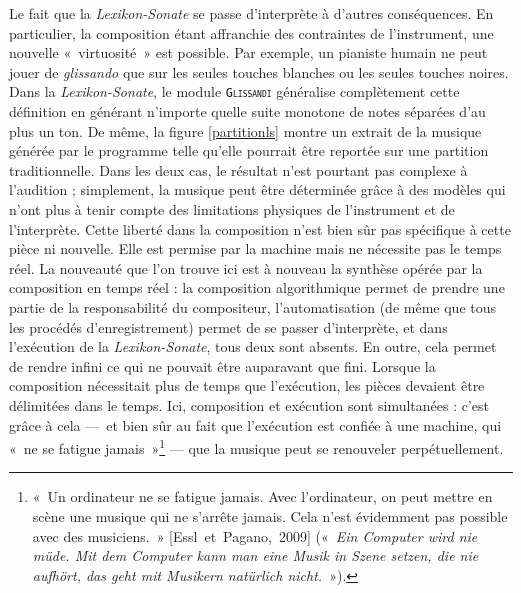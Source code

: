 \documentclass[a4paper,12pt]{article}
\newcommand{\guill}[1]{«~#1~»}
\newcommand{\cicite}[1]{{\footnotesize[#1]}}
\begin{document}
Le fait que la \emph{Lexikon-Sonate} se passe d'interprète à d'autres conséquences. En particulier, la composition étant affranchie des contraintes de l'instrument, une nouvelle \guill{virtuosité} est possible. Par exemple, un pianiste humain ne peut jouer de \emph{glissando} que sur les seules touches blanches ou les seules touches noires. Dans la \emph{Lexikon-Sonate}, le module \texttt{\textsc{Glissandi}} généralise complètement cette définition en générant n'importe quelle suite monotone de notes séparées d'au plus un ton. De même, la figure \ref{partitionls} montre un extrait de la musique générée par le programme telle qu'elle pourrait être reportée sur une partition traditionnelle. Dans les deux cas, le résultat n'est pourtant pas complexe à l'audition ; simplement, la musique peut être déterminée grâce à des modèles qui n'ont plus à tenir compte des limitations physiques de l'instrument et de l'interprète. Cette liberté dans la composition n'est bien sûr pas spécifique à cette pièce ni nouvelle. Elle est permise par la machine mais ne nécessite pas le temps réel. La nouveauté que l'on trouve ici est à nouveau la synthèse opérée par la composition en temps réel : la composition algorithmique permet de prendre une partie de la responsabilité du compositeur, l'automatisation (de même que tous les procédés d'enregistrement) permet de se passer d'interprète, et dans l'exécution de la \emph{Lexikon-Sonate}, tous deux sont absents. En outre, cela permet de rendre infini ce qui ne pouvait être auparavant que fini. Lorsque la composition nécessitait plus de temps que l'exécution, les pièces devaient être délimitées dans le temps. Ici, composition et exécution sont simultanées : c'est grâce à cela ---~et bien sûr au fait que l'exécution est confiée à une machine, qui \guill{ne se fatigue jamais}\footnote{\guill{Un ordinateur ne se fatigue jamais. Avec l'ordinateur, on peut mettre en scène une musique qui ne s'arrête jamais. Cela n'est évidemment pas possible avec des musiciens.} \cicite{Essl~et~Pagano,~2009} (\guill{\emph{Ein Computer wird nie müde. Mit dem Computer kann man eine Musik in Szene setzen, die nie aufhört, das geht mit Musikern natürlich nicht.}}).} --- que la musique peut se renouveler perpétuellement.
\end{document}
